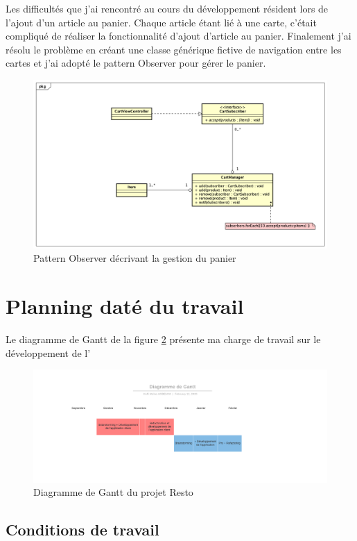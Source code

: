 Les difficultés que j'ai rencontré au cours du développement résident lors de l'ajout d'un article au panier. Chaque article étant lié à une carte, c'était compliqué de réaliser la fonctionnalité d'ajout  d'article au panier. Finalement j'ai résolu le problème en créant une classe générique fictive de navigation entre les cartes et j'ai adopté le pattern Observer pour gérer le panier.

\begin{figure}[H]
	\centering
	\includegraphics[scale=0.3]{assets/images/cart_management.png}
	\caption{Pattern Observer décrivant la gestion du panier}
	\label{fig.19}
\end{figure}

\section{Planning daté du travail}
Le diagramme de Gantt de la figure \ref{fig.20} présente ma charge de travail sur le développement de l'\ar
\begin{figure}[H]
	\centering
	\includegraphics[scale=0.8]{assets/images/Gantt_resto.png}
	\caption{Diagramme de Gantt du projet Resto}
	\label{fig.20}
\end{figure}

\subsection{Conditions de travail}
